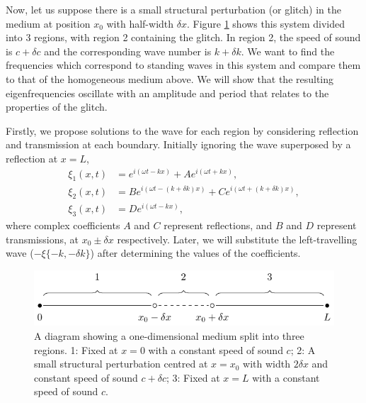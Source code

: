 Now, let us suppose there is a small structural perturbation (or glitch) in the medium at position \(x_0\) with half-width \(\delta x\). Figure \ref{fig:1d-diagram} shows this system divided into 3 regions, with region 2 containing the glitch. In region 2, the speed of sound is \(c + \delta c\) and the corresponding wave number is \(k + \delta k\). We want to find the frequencies which correspond to standing waves in this system and compare them to that of the homogeneous medium above. We will show that the resulting eigenfrequencies oscillate with an amplitude and period that relates to the properties of the glitch.

Firstly, we propose solutions to the wave for each region by considering reflection and transmission at each boundary. Initially ignoring the wave superposed by a reflection at \(x=L\),
%
\begin{align}
    \xi_1(x, t) &= e^{i(\omega t - k x)} + A e^{i(\omega t + k x)}, \label{eq:xi1-r} \\
    \xi_2(x, t) &= Be^{i(\omega t - (k + \delta k) x)} + C e^{i(\omega t + (k + \delta k) x)}, \label{eq:xi2-r} \\
    \xi_3(x, t) &= D e^{i(\omega t - k x)}, \label{eq:xi3-r}
\end{align}
%
where complex coefficients \(A\) and \(C\) represent reflections, and \(B\) and \(D\) represent transmissions, at \(x_0 \pm \delta x\) respectively. Later, we will substitute the left-travelling wave (\(- \xi\{-k, -\delta k\}\)) after determining the values of the coefficients.

\begin{figure}
    \centering
    \includegraphics{figures/glitch-1d-example-diagram.pdf}
    \caption[A diagram showing a one-dimensional medium with a small structural perturbation.]{A diagram showing a one-dimensional medium split into three regions. 1: Fixed at \(x=0\) with a constant speed of sound \(c\); 2: A small structural perturbation centred at \(x=x_0\) with width \(2\delta x\) and constant speed of sound \(c + \delta c\); 3: Fixed at \(x=L\) with a constant speed of sound \(c\).}
    \label{fig:1d-diagram}
\end{figure}

